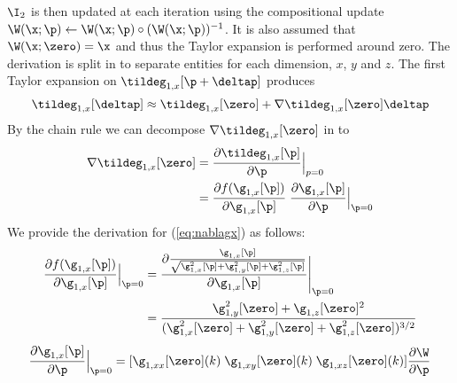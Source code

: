 $\I_2$ is then updated at each iteration using the compositional update $\W(\x;\p) \leftarrow \W(\x;\p) \circ (\W(\x;\p))^{-1}$. It is also assumed that $\W(\x;\zero) = \x$ and thus the Taylor expansion is performed around zero. The derivation is split in to separate entities for each dimension, $x$, $y$ and $z$. The first Taylor expansion on $\tildeg_{1,x}[\p + \deltap]$ produces
\begin{equation}\label{eq:eucgx}
    \tildeg_{1,x}[\deltap] \approx \tildeg_{1,x}[\zero] + \nabla \tildeg_{1,x}[\zero] \deltap
\end{equation}
By the chain rule we can decompose $\nabla \tildeg_{1,x}[\zero]$ in to
\begin{equation}
  \begin{aligned}\label{eq:nablagx}
    \nabla \tildeg_{1,x}[\zero] &= \frac{\partial \tildeg_{1,x}[\p]}{\partial \p}\Big|_{p=0} \\
                              &= \frac{\partial f(\g_{1,x}[\p])}{\partial \g_{1,x}[\p]} \; \frac{\partial \g_{1,x}[\p]}{\partial \p}\Big|_{\p=0}
  \end{aligned}
\end{equation}
We provide the derivation for (\ref{eq:nablagx}) as follows:
\begin{equation}
  \begin{aligned}\label{eq:derivefgx}
    \frac{\partial f(\g_{1,x}[\p])}{\partial \g_{1,x}[\p]}\Big|_{\p=0} &= \frac{\partial \frac{\g_{1,x}[\p]}{\sqrt{\g_{1,x}^2[\p] + \g_{1,y}^2[\p] + \g_{1,z}^2[\p]}}}{\partial \g_{1,x}[\p]}\Bigg|_{\p=0} \\
     &= \frac{\g_{1,y}^2[\zero] + \g_{1,z}[\zero]^2}{(\g_{1,x}^2[\zero] + \g_{1,y}^2[\zero] + \g_{1,z}^2[\zero])^{3/2}}
  \end{aligned}
\end{equation}
\begin{equation}\label{eq:derivegxp}
    \frac{\partial \g_{1,x}[\p]}{\partial \p}\Big|_{\p=0} = [ \g_{1,xx}[\zero](k) \; \g_{1,xy}[\zero](k) \; \g_{1,xz}[\zero](k) ] \frac{\partial \W}{\partial \p}
\end{equation}
